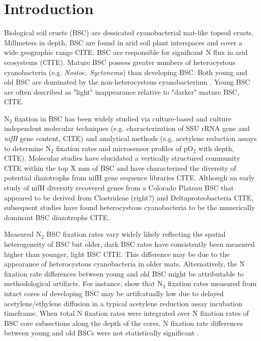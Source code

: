 \section{Introduction}


Biological soil crusts (BSC) are dessicated cyanobacterial mat-like topsoil crusts. Millmeters in depth, BSC are found in arid soil plant interspaces and cover a wide geographic range CITE. BSC are responsible for significant N flux in arid ecosystems (CITE). Mature BSC possess greater numbers of heterocystous cyanobacteria (e.g. \textit{Nostoc, Syctonema}) than developing BSC. Both young and old BSC are dominated by the non-heterocystous cyanobacterium . Young BSC are often described as "light" inappearance relative to "darker" mature BSC, CITE.

N$_{2}$ fixation in BSC has been widely studied via culture-based and culture independent molecular techniques (e.g. characterization of SSU rRNA gene and \textit{nifH} gene content, CITE) and analytical methods (e.g. acetylene reduction assays to determine N$_{2}$ fixation rates and microsensor profiles of pO$_{2}$ with depth, CITE). Molecular studies have elucidated a vertically structured community CITE within the top X mm of BSC and have characterized the diversity of potential diazotrophs from nifH gene sequence libraries CITE. Although an early study of nifH diversity recovered genes from a Colorado Plateau BSC that appeared to be derived from Clostrideae (right?) and Deltaproteobacteria CITE, subsequent studies have found heterocystous cyanobacteria to be the numerically dominant BSC diazotrophs CITE. 

Measured N$_{2}$ BSC fixation rates vary widely likely reflecting the spatial heterogeneity of BSC but older, dark BSC rates have consistently been measured higher than younger, light BSC CITE. This difference may be due to the appearance of heterocystous cyanobacteria in older mats. Alternatively, the N fixation rate differences between young and old BSC might be attributable to methodological artifacts. For instance, \citet{15643930} show that N$_{2}$ fixation rates measured from intact cores of developing BSC may be artifcatually low due to delayed acetylene/ethylene diffusion in a typical acetylene reduction assay incubation timeframe. When total N fixation rates were integrated over N fixation rates of BSC core subsections along the depth of the cores, N fixation rate differences between young and old BSCs were not statistically significant \cite{15643930}.

